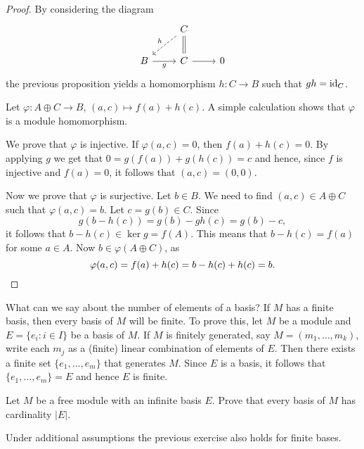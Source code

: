 \begin{proof}
    By considering the diagram
\[\begin{tikzcd}
	& C \\
	B & C & 0
	\arrow["g"', from=2-1, to=2-2]
	\arrow[from=2-2, to=2-3]
	\arrow[equal, no head, from=1-2, to=2-2]
	\arrow["h"', dashed, from=1-2, to=2-1]
\end{tikzcd}\]
	the previous proposition 
	yields a homomorphism $h\colon C\to B$
	such that $gh=\operatorname{id}_C$. 

	Let $\varphi\colon A\oplus C\to B$, $(a,c)\mapsto f(a)+h(c)$. A simple
	calculation shows that $\varphi$ is a module homomorphism. 

	We prove that $\varphi$ is 
	injective. If $\varphi(a,c)=0$, then $f(a)+h(c)=0$. By applying $g$ we get that
	$0=g(f(a))+g(h(c))=c$ and hence, since $f$ is injective and
	$f(a)=0$, it follows that $(a,c)=(0,0)$. 
		
	Now we prove that $\varphi$ is surjective. 
	Let $b\in B$. 
	We need to find $(a,c)\in A\oplus C$ such that $\varphi(a,c)=b$. 
	Let $c=g(b)\in C$. Since
	\[
		g(b-h(c))=g(b)-gh(c)=g(b)-c,
	\]
	it follows that $b-h(c)\in \ker g=f(A)$. This means
	that $b-h(c)=f(a)$ for some $a\in A$. Now $b\in \varphi(A\oplus C)$, as
	\[
		\varphi(a,c)=f(a)+h(c)=b-h(c)+h(c)=b.\qedhere
	\]
\end{proof}

What can we say about the number of elements of a basis? 
If $M$ has a finite basis, then every basis of $M$ will be finite. To prove
this, let $M$ be a module 
and $E=\{e_i:i\in I\}$ be a basis of $M$. If $M$ is finitely generated, say 
$M=(m_1,\dots,m_k)$, write each $m_j$ as a (finite) linear combination of elements
of $E$. Then there exists 
a finite set $\{e_1,\dots,e_m\}$ that generates $M$. Since 
$E$ is a basis, it follows that
$\{e_1,\dots,e_m\}=E$ and hence $E$ is finite.  

\begin{exercise}
\label{xca:cardinality}
    Let $M$ be a free module with an infinite basis $E$. Prove
    that every basis of $M$ has cardinality $|E|$. 
\end{exercise}

Under additional assumptions the previous exercise also holds for 
finite bases. 

